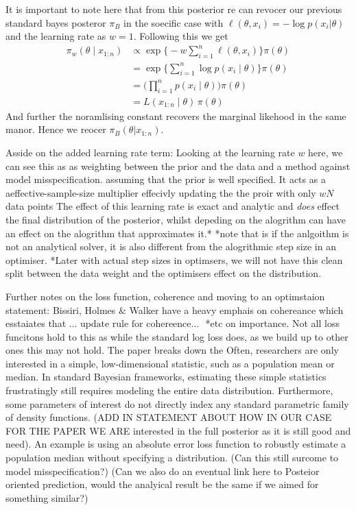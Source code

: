 \documentclass[11pt,a4paper]{article}
\begin{document}
It is important to note here that from this posterior re can revocer our previous standard bayes posteror $\pi_{B}$ in the soecific case with $\ell(\theta, x_i) = -\log p(x_i | \theta)$ and the learning rate as $w = 1$. Following this we get
\begin{align*}
    \pi_w(\theta \mid x_{1:n}) & \propto \exp\!\Big\{-w\sum_{i=1}^{n}\ell(\theta, x_i)\Big\}\pi(\theta) \\
                               & = \exp\!\Big\{\sum_{i=1}^{n}\log p(x_i \mid \theta)\Big\}\pi(\theta)   \\
                               & = \Big(\prod_{i=1}^{n} p(x_i \mid \theta)\Big)\pi(\theta)              \\
                               & = L(x_{1:n}\mid\theta)\,\pi(\theta)
\end{align*}
And further the noramlising constant recovers the marginal likehood in the same manor. Hence we reocer $\pi_B(\theta | x_{1:n})$.

Asside on the added learning rate term:
Looking at the learning rate $w$ here, we can see this as as weighting between the prior and the data and a method against model misspecification. assuming that the prior is well specified. It acts as a aeffective-sample-size multiplier effecivly updating the the proir with only $wN$ data points 
The effect of this learning rate is exact and analytic and \textit{does} effect the final distribution of the posterior, whilst depeding on the alogrithm can have an effect on the alogrithm that approximates it.*
*note that is if the anlgoithm is not an analytical solver, it is also different from the alogrithmic step size in an optimiser.
*Later with actual step sizes in optimsers, we will not have this clean split between the data weight and the optimisers effect on the distribution. 

Further notes on the loss function, coherence and moving to an optimstaion statement:
Bissiri, Holmes $\&$ Walker have a heavy emphais on cohereance which esstaiates that $\text{... update rule for cohereence... }$ *etc on importance. Not all loss funcitons hold to this as while the standard log loss does, as we build up to other ones this may not hold. 
The paper breaks down the Often, researchers are only interested in a simple, low-dimensional statistic, such as a population mean or median.
In standard Bayesian frameworks, estimating these simple statistics frustratingly still requires modeling the entire data distribution. Furthermore, some parameters of interest do not directly index any standard parametric family of density functions. (ADD IN STATEMENT ABOUT HOW IN OUR CASE FOR THE PAPER WE ARE interested in the full posterior as it is still good and need). An example is using an absolute error loss function to robustly estimate a population median without specifying a distribution. (Can this still surcome to model misspecification?) (Can we also do an eventual link here to Posteior oriented prediction, would the analyical result be the same if we aimed for something similar?)
\end{document}
